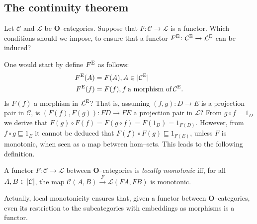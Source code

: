 \subsection{The continuity theorem}

Let \(\mathcal{C}\) and \(\mathcal{L}\) be \(\mathbf{O}\)--categories. Suppose that \(F \colon \mathcal{C} \to \mathcal{L}\) is a functor.
Which conditions should we impose, to ensure that a functor \(F^\textup{E} \colon \mathcal{C}^\textup{E} \to \mathcal{L}^\textup{E}\) can be induced?

One would start by define \(F^\textup{E}\) as follows:
\begin{align*}
  F^\textup{E}(A) &= F(A), A \in \lvert \mathcal{C}^\textup{E} \rvert \\
  F^\textup{E}(f) &= F(f), f\:\text{a morphism of}\:\mathcal{C}^\textup{E}.
\end{align*}
Is \(F(f)\) a morphism in \(\mathcal{L}^\textup{E}\)?
That is, assuming \((f,g) \colon D \to E\) is a projection pair in \(\mathcal{C}\), is \((F(f),F(g)) \colon FD \to FE\) a projection pair in \(\mathcal{L}\)?
From \(g \circ f = 1_D\) we derive that \(F(g) \circ F(f) = F(g \circ f) = F(1_D) = 1_{F(D)}\).
However, from \(f \circ g \sqsubseteq 1_E\) it cannot be deduced that \(F(f) \circ F(g) \sqsubseteq 1_{F(E)}\), unless \(F\) is monotonic, when seen as a map between hom--sets. %
This leads to the following definition.

\begin{dfn}
  A functor \(F \colon \mathcal{C} \to \mathcal{L}\) between \(\mathbf{O}\)--categories is \emph{locally monotonic} iff, for all \(A, B \in \lvert \mathcal{C} \rvert\), the map \(\mathcal{C}(A,B) \overset{F}{\to}\mathcal{L}(FA,FB)\) is monotonic.
\end{dfn}

Actually, local monotonicity ensures that, given a functor between \(\mathbf{O}\)--categories, even its restriction to the subcategories with embeddings as morphisms is a functor.

